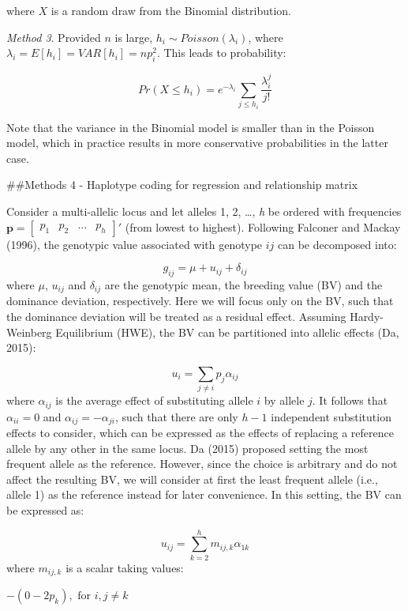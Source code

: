 \documentclass[
]{article}
\begin{document}
where \(X\) is a random draw from the Binomial distribution.

\emph{Method 3}. Provided \(n\) is large,
\(h_i \sim Poisson(\lambda_i)\), where
\(\lambda_i = E[h_i] = VAR[h_i] = np_i^2\). This leads to probability:

\[Pr(X \leq h_i) = e^{-\lambda_i} \sum\limits_{j \leq h_i}^{} \frac{\lambda_i^j}{j!}\]

Note that the variance in the Binomial model is smaller than in the
Poisson model, which in practice results in more conservative
probabilities in the latter case.

\pagebreak

\#\#Methods 4 - Haplotype coding for regression and relationship matrix

Consider a multi-allelic locus and let alleles 1, 2, \ldots, \emph{h} be
ordered with frequencies
\(\mathbf{p} = \begin{bmatrix} p_1 & p_2 & ... & p_h \end{bmatrix}'\)
(from lowest to highest). Following Falconer and Mackay (1996), the
genotypic value associated with genotype \(ij\) can be decomposed into:

\[g_{ij} = \mu + u_{ij} + \delta_{ij}\] where \(\mu\), \(u_{ij}\) and
\(\delta_{ij}\) are the genotypic mean, the breeding value (BV) and the
dominance deviation, respectively. Here we will focus only on the BV,
such that the dominance deviation will be treated as a residual effect.
Assuming Hardy-Weinberg Equilibrium (HWE), the BV can be partitioned
into allelic effects (Da, 2015):

\[u_i = \sum_{j \neq i} p_j \alpha_{ij}\] where \(\alpha_{ij}\) is the
average effect of substituting allele \(i\) by allele \(j\). It follows
that \(\alpha_{ii} = 0\) and \(\alpha_{ij} = - \alpha_{ji}\), such that
there are only \(h - 1\) independent substitution effects to consider,
which can be expressed as the effects of replacing a reference allele by
any other in the same locus. Da (2015) proposed setting the most
frequent allele as the reference. However, since the choice is arbitrary
and do not affect the resulting BV, we will consider at first the least
frequent allele (i.e., allele 1) as the reference instead for later
convenience. In this setting, the BV can be expressed as:

\[u_{ij} = \sum_{k = 2}^{h} m_{ij,k}\alpha_{1k}\] where \(m_{ij,k}\) is
a scalar taking values:

\(-(0-2p_k), \text{ for } i,j \neq k\)
\end{document}
